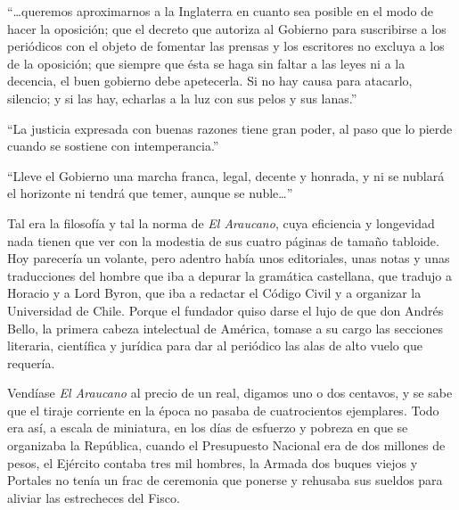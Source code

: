 \documentclass[10pt,twoside,openright]{memoir}
\begin{document}
``\ldots queremos aproximarnos a la
Inglaterra en cuanto sea posible en el modo de hacer la oposición; que
el decreto que autoriza al Gobierno para suscribirse a los periódicos
con el objeto de fomentar las prensas y los escritores no excluya a los
de la oposición; que siempre que ésta se haga sin faltar a las leyes ni
a la decencia, el buen gobierno debe apetecerla. Si no hay causa para
atacarlo, silencio; y si las hay, echarlas a la luz con sus pelos y sus
lanas.''

``La justicia expresada con buenas razones tiene gran poder, al paso que
lo pierde cuando se sostiene con intemperancia.''

``Lleve el Gobierno una marcha franca, legal, decente y honrada, y ni se
nublará el horizonte ni tendrá que temer, aunque se nuble\ldots''


 Tal era la filosofía y tal la norma
de \emph{El Araucano}, cuya eficiencia y longevidad nada tienen que ver con la
modestia de sus cuatro páginas de tamaño tabloide. Hoy parecería un
volante, pero adentro había unos editoriales, unas notas y unas
traducciones del hombre que iba a depurar la gramática castellana, que
tradujo a Horacio y a Lord Byron, que iba a redactar el Código Civil y a
organizar la Universidad de Chile. Porque el fundador quiso darse el
lujo de que don Andrés Bello, la primera cabeza intelectual de América,
tomase a su cargo las secciones literaria, científica y jurídica para
dar al periódico las alas de alto vuelo que requería.

Vendíase \emph{El Araucano} al precio de un real, digamos uno o dos centavos, y
se sabe que el tiraje corriente en la época no pasaba de cuatrocientos
ejemplares. Todo era así, a escala de miniatura, en los días de esfuerzo
y pobreza en que se organizaba la República, cuando el Presupuesto
Nacional era de dos millones de pesos, el Ejército contaba tres mil
hombres, la Armada dos buques viejos y Portales no tenía un frac de
ceremonia que ponerse y rehusaba sus sueldos para aliviar las
estrecheces del Fisco.
\end{document}

